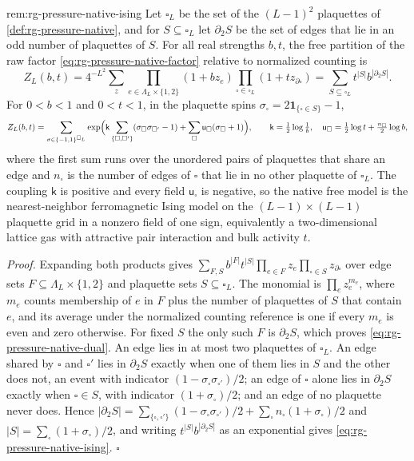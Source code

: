 {rem:rg-pressure-native-ising}
Let $\square_L$ be the set of the $(L-1)^2$ plaquettes of
\cref{def:rg-pressure-native}, and for $S\subseteq\square_L$ let
$\partial_2S$ be the set of edges that lie in an odd number of plaquettes of
$S$. For all real strengths $b,t$, the free partition of the raw factor
\cref{eq:rg-pressure-native-factor} relative to normalized counting is
\begin{equation}
 Z_L(b,t)=4^{-L^2}\sum_z\prod_{e\in\Lambda_L\times\{1,2\}}(1+bz_e)
 \prod_{\square\in\square_L}(1+tz_{\partial\square})
 =\sum_{S\subseteq\square_L}t^{|S|}b^{|\partial_2S|}.
 \label{eq:rg-pressure-native-dual}
\end{equation}
For $0<b<1$ and $0<t<1$, in the plaquette spins
$\sigma_\square=2\mathbf 1_{\{\square\in S\}}-1$,
\begin{equation}
 Z_L(b,t)=\sum_{\sigma\in\{-1,1\}^{\square_L}}
 \exp\Bigl(\mathsf k\sum_{\{\square,\square'\}}(\sigma_\square\sigma_{\square'}-1)
 +\sum_{\square}\mathsf u_\square(\sigma_\square+1)\Bigr),
 \qquad
 \mathsf k=\tfrac12\log\tfrac1b,\quad
 \mathsf u_\square=\tfrac12\log t+\tfrac{n_\square}2\log b,
 \label{eq:rg-pressure-native-ising}
\end{equation}
where the first sum runs over the unordered pairs of plaquettes that share an
edge and $n_\square$ is the number of edges of $\square$ that lie in no other
plaquette of $\square_L$. The coupling $\mathsf k$ is positive and every field
$\mathsf u_\square$ is negative, so the native free model is the
nearest-neighbor ferromagnetic Ising model on the $(L-1)\times(L-1)$ plaquette
grid in a nonzero field of one sign, equivalently a two-dimensional lattice
gas with attractive pair interaction and bulk activity $t$.

\noindent\emph{Proof.}
Expanding both products gives
$\sum_{F,S}b^{|F|}t^{|S|}\prod_{e\in F}z_e\prod_{\square\in S}z_{\partial\square}$
over edge sets $F\subseteq\Lambda_L\times\{1,2\}$ and plaquette sets
$S\subseteq\square_L$. The monomial is $\prod_ez_e^{m_e}$, where $m_e$ counts
membership of $e$ in $F$ plus the number of plaquettes of $S$ that contain
$e$, and its average under the normalized counting reference is one if every
$m_e$ is even and zero otherwise. For fixed $S$ the only such $F$ is
$\partial_2S$, which proves \cref{eq:rg-pressure-native-dual}. An edge lies
in at most two plaquettes of $\square_L$. An edge shared by $\square$ and
$\square'$ lies in $\partial_2S$ exactly when one of them lies in $S$ and the
other does not, an event with indicator
$(1-\sigma_\square\sigma_{\square'})/2$; an edge of $\square$ alone lies in
$\partial_2S$ exactly when $\square\in S$, with indicator
$(1+\sigma_\square)/2$; and an edge of no plaquette never does. Hence
$|\partial_2S|=\sum_{\{\square,\square'\}}(1-\sigma_\square\sigma_{\square'})/2
+\sum_\square n_\square(1+\sigma_\square)/2$ and
$|S|=\sum_\square(1+\sigma_\square)/2$, and writing
$t^{|S|}b^{|\partial_2S|}$ as an exponential gives
\cref{eq:rg-pressure-native-ising}. $\square$

